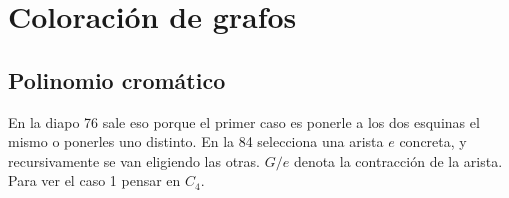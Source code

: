 \documentclass[TGyGC.tex]{subfiles}
\begin{document}
\chapter{Coloración de grafos}
\section{Polinomio cromático}
En la diapo 76 sale eso porque el primer caso es ponerle a los dos esquinas el mismo o ponerles uno distinto. En la 84 selecciona una arista $e$ concreta, y recursivamente se van eligiendo las otras. $G/e$ denota la contracción de la arista. Para ver el caso 1 pensar en $C_4$. 
\end{document}
